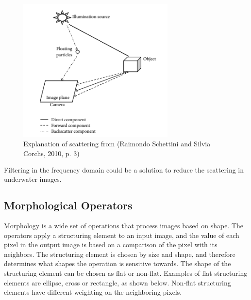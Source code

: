 \begin{figure}[h]
    \centering
    \includegraphics[width=0.7\textwidth]{images/image_from_paper}
    \caption{Explanation of scattering from (Raimondo Schettini and Silvia Corchs, 2010, p. 3)}
    \label{fig:image_from_paper}
\end{figure}

Filtering in the frequency domain could be a solution to reduce the scattering in underwater images.


\subsection{Morphological Operators}

Morphology is a wide set of operations that process images based on shape. The operators apply a structuring element to an input image, and the value of each pixel in the output image is based on a comparison of the pixel with its neighbors. The structuring element is chosen by size and shape, and therefore determines what shapes the operation is sensitive towards. 
The shape of the structuring element can be chosen as flat or non-flat. Examples of flat structuring elements are ellipse, cross or rectangle, as shown below. Non-flat structuring elements have different weighting on the neighboring pixels. 

